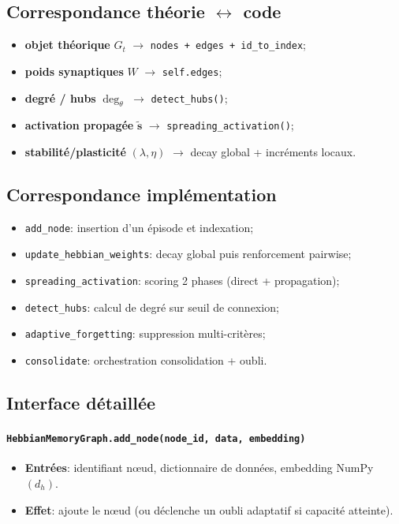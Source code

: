 \documentclass[12pt,a4paper]{article}
\begin{document}
\subsection{Correspondance théorie $\leftrightarrow$ code}
\begin{itemize}
    \item \textbf{objet théorique} $G_t$ $\rightarrow$ \texttt{nodes + edges + id\_to\_index};
    \item \textbf{poids synaptiques} $W$ $\rightarrow$ \texttt{self.edges};
    \item \textbf{degré / hubs} $\deg_\theta$ $\rightarrow$ \texttt{detect\_hubs()};
    \item \textbf{activation propagée} $\tilde{\mathbf{s}}$ $\rightarrow$ \texttt{spreading\_activation()};
    \item \textbf{stabilité/plasticité} $(\lambda,\eta)$ $\rightarrow$ decay global + incréments locaux.
\end{itemize}

\subsection{Correspondance implémentation}
\begin{itemize}
    \item \texttt{add\_node}: insertion d'un épisode et indexation;
    \item \texttt{update\_hebbian\_weights}: decay global puis renforcement pairwise;
    \item \texttt{spreading\_activation}: scoring 2 phases (direct + propagation);
    \item \texttt{detect\_hubs}: calcul de degré sur seuil de connexion;
    \item \texttt{adaptive\_forgetting}: suppression multi-critères;
    \item \texttt{consolidate}: orchestration consolidation + oubli.
\end{itemize}

\subsection{Interface détaillée}

\paragraph{\texttt{HebbianMemoryGraph.add\_node(node\_id, data, embedding)}}
\begin{itemize}[leftmargin=*]
    \item \textbf{Entrées}: identifiant n\oe ud, dictionnaire de données, embedding NumPy $(d_h)$.
    \item \textbf{Effet}: ajoute le n\oe ud (ou déclenche un oubli adaptatif si capacité atteinte).
\end{itemize}
\end{document}
